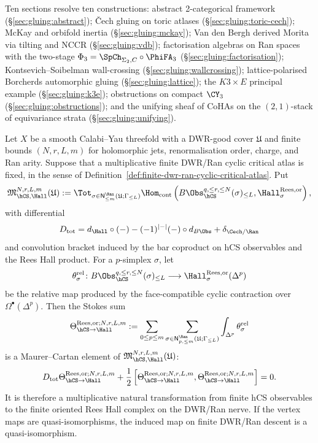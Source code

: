 Ten sections resolve ten constructions: abstract 2-categorical
framework (\S\ref{sec:gluing:abstract}); \v{C}ech gluing on toric atlases
(\S\ref{sec:gluing:toric-cech}); McKay and orbifold inertia
(\S\ref{sec:gluing:mckay}); Van den Bergh derived Morita via tilting
and NCCR (\S\ref{sec:gluing:vdb}); factorisation algebras on Ran spaces
with the two-stage $\Phi_3 = \SpCh_{\Sigma_2, C} \circ \PhiFA_3$
(\S\ref{sec:gluing:factorisation}); Kontsevich--Soibelman wall-crossing
(\S\ref{sec:gluing:wallcrossing}); lattice-polarised Borcherds automorphic
gluing (\S\ref{sec:gluing:lattice}); the $K3 \times E$ principal example
(\S\ref{sec:gluing:k3e}); obstructions on compact $\CY_3$
(\S\ref{sec:gluing:obstructions}); and the unifying sheaf of CoHAs on
the $(2,1)$-stack of equivariance strata (\S\ref{sec:gluing:unifying}).

\begin{proposition}
\label{prop:gluing-finite-dwr-ran-rees}
Let $X$ be a smooth Calabi--Yau threefold with a DWR-good cover
$\mathfrak U$ and finite bounds $(N,r,L,m)$ for holomorphic jets,
renormalisation order, charge, and Ran arity. Suppose that a
multiplicative finite DWR/Ran cyclic critical atlas is fixed, in the
sense of Definition~\ref{def:finite-dwr-ran-cyclic-critical-atlas}. Put
\[
 \mathfrak M_{\hCS,\Hall}^{N,r,L,m}(\mathfrak U)
 :=
 \Tot_{\sigma\in\mathsf N^{\Ran}_{\leq m}(\mathfrak U;\Gamma_{\leq L})}
 \Hom_{\mathrm{cont}}
 \left(
 B\Obs_{\hCS}^{q,\leq r,\leq N}(\sigma)_{\leq L},
 \Hall_{\sigma}^{\mathrm{Rees},\mathrm{or}}
 \right),
\]
with differential
\[
 D_{\mathrm{tot}}
 =
 d_{\Hall}\circ(-)
 -(-1)^{|-|}(-)\circ d_{B\Obs}
 +\delta_{\Cech/\Ran}
\]
and convolution bracket induced by the bar coproduct on hCS
observables and the Rees Hall product. For a $p$-simplex $\sigma$, let
\[
 \theta_\sigma^{\mathrm{rel}}\colon
 B\Obs_{\hCS}^{q,\leq r,\leq N}(\sigma)_{\leq L}
 \longrightarrow
 \Hall_{\sigma}^{\mathrm{Rees},\mathrm{or}}(\Delta^p)
\]
be the relative map produced by the face-compatible cyclic contraction
over $\Omega^\bullet(\Delta^p)$. Then the Stokes sum
\[
 \Theta_{\hCS\to\Hall}^{\mathrm{Rees},\mathrm{or};N,r,L,m}
 :=
 \sum_{0\leq p\leq m}
 \sum_{\sigma\in
 \mathsf N^{\Ran}_{p,\leq m}(\mathfrak U;\Gamma_{\leq L})}
 \int_{\Delta^p}\theta_\sigma^{\mathrm{rel}}
\]
is a Maurer--Cartan element of
$\mathfrak M_{\hCS,\Hall}^{N,r,L,m}(\mathfrak U)$:
\[
 D_{\mathrm{tot}}
 \Theta_{\hCS\to\Hall}^{\mathrm{Rees},\mathrm{or};N,r,L,m}
 +\frac{1}{2}
 \left[
 \Theta_{\hCS\to\Hall}^{\mathrm{Rees},\mathrm{or};N,r,L,m},
 \Theta_{\hCS\to\Hall}^{\mathrm{Rees},\mathrm{or};N,r,L,m}
 \right]
 =0.
\]
It is therefore a multiplicative natural transformation from finite
hCS observables to the finite oriented Rees Hall complex on the
DWR/Ran nerve. If the vertex maps are quasi-isomorphisms, the induced
map on finite DWR/Ran descent is a quasi-isomorphism.


\end{proposition}
